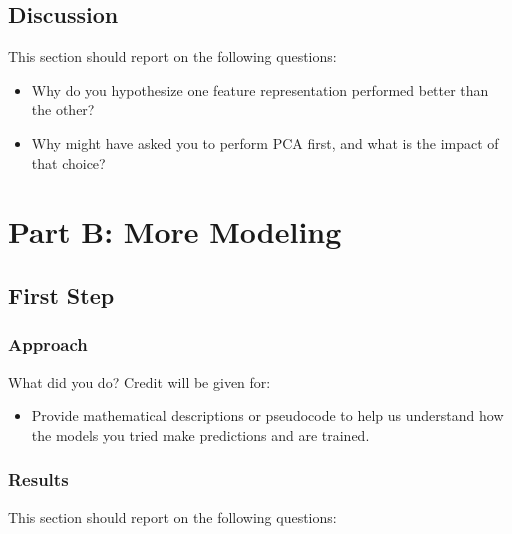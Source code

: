 \documentclass[11pt]{article}
\begin{document}
\subsection{Discussion}

This section should report on the following questions: 

\begin{itemize}
  \item Why do you hypothesize one feature representation performed better than the other?  
  \item Why might have asked you to perform PCA first, and what is the impact of that choice?
  \end{itemize}

\section{Part B: More Modeling}

\subsection{First Step}

\subsubsection{Approach}

What did you do? Credit will be given for:

  \begin{itemize}
  \item Provide mathematical descriptions or pseudocode to help us understand how the models you tried make predictions and are trained.
  \end{itemize}

\subsubsection{Results}
This section should report on the following questions: 
\end{document}
